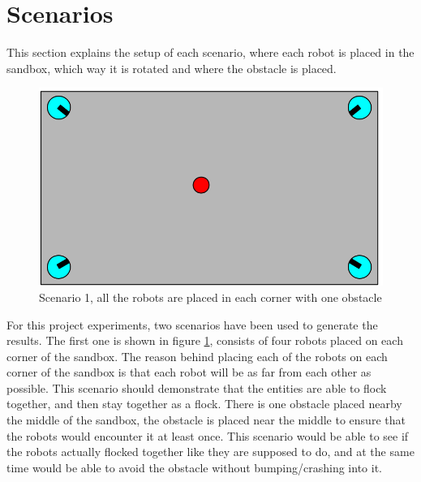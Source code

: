 \section{Scenarios}
This section explains the setup of each scenario, where each robot is placed in the sandbox, which way it is rotated and where the obstacle is placed.
\label{sec:scenario}
\begin{figure}[h]
\begin{center}
\includegraphics[width=0.8\linewidth]{figs/scenario0}
\end{center}
\caption[scenario 1]{Scenario 1, all the robots are placed in each corner with one obstacle}
\label{fig:scenario0}
\end{figure}
For this project experiments, two scenarios have been used to generate the results. The first one is shown in figure \ref{fig:scenario0}, consists of four robots placed on each corner of the sandbox. The reason behind placing each of the robots on each corner of the sandbox is that each robot will be as far from each other as possible. This scenario should demonstrate that the entities are able to flock together, and then stay together as a flock. There is one obstacle placed nearby the middle of the sandbox, the obstacle is placed near the middle to ensure that the robots would encounter it at least once. This scenario would be able to see if the robots actually flocked together like they are supposed to do, and at the same time would be able to avoid the obstacle without bumping/crashing into it.

